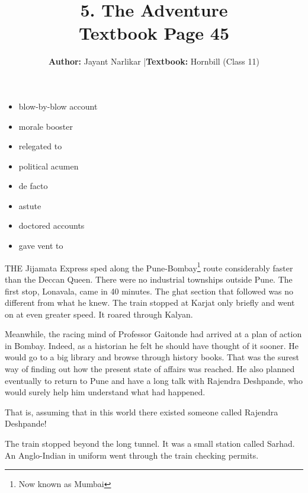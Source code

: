 \documentclass[12pt,a4paper]{article}
\title{\textbf{5. The Adventure}\\[0.3em] \Large Textbook Page 45}
\author{\textbf{Author:} Jayant Narlikar \quad|\quad \textbf{Textbook:} Hornbill (Class 11)}
\date{}
\begin{document}
\maketitle

\begin{tcolorbox}[colback=gray!5!white,colframe=gray!75!black,title=\textbf{Notice these expressions in the text. Infer their meaning from the context.}]
\begin{itemize}
    \item blow-by-blow account
    \item morale booster
    \item relegated to
    \item political acumen
    \item de facto
    \item astute
    \item doctored accounts
    \item gave vent to
\end{itemize}
\end{tcolorbox}

\vspace{0.5cm}

THE Jijamata Express sped along the Pune-Bombay\footnote{Now known as Mumbai} route considerably faster than the Deccan Queen. There were no industrial townships outside Pune. The first stop, Lonavala, came in 40 minutes. The ghat section that followed was no different from what he knew. The train stopped at Karjat only briefly and went on at even greater speed. It roared through Kalyan.

Meanwhile, the racing mind of Professor Gaitonde had arrived at a plan of action in Bombay. Indeed, as a historian he felt he should have thought of it sooner. He would go to a big library and browse through history books. That was the surest way of finding out how the present state of affairs was reached. He also planned eventually to return to Pune and have a long talk with Rajendra Deshpande, who would surely help him understand what had happened.

That is, assuming that in this world there existed someone called Rajendra Deshpande!

The train stopped beyond the long tunnel. It was a small station called Sarhad. An Anglo-Indian in uniform went through the train checking permits.

\vfill
\end{document}
